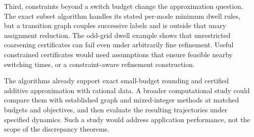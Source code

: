 Third, constraints beyond a switch budget change the approximation question.
The exact subset algorithm handles its stated per-mode minimum dwell rules,
but a transition graph couples successive labels and is outside that unary
assignment reduction. The odd-grid dwell example shows that unrestricted
coarsening certificates can fail even under arbitrarily fine refinement.
Useful constrained certificates would need assumptions that ensure feasible
nearby switching times, or a constraint-aware refinement construction.

The algorithms already support exact small-budget rounding and certified
additive approximation with rational data. A broader computational study
could compare them with established graph and mixed-integer methods at
matched budgets and objectives, and then evaluate the resulting trajectories
under specified dynamics. Such a study would address application performance,
not the scope of the discrepancy theorems.
